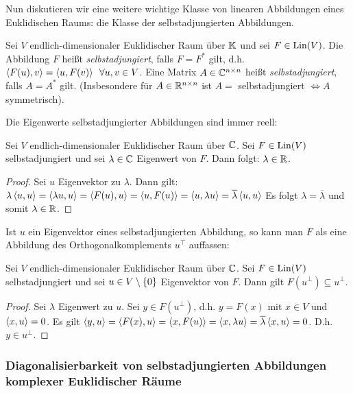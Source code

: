 Nun diskutieren wir eine weitere wichtige Klasse von linearen Abbildungen eines Euklidischen Raums: die Klasse der selbstadjungierten Abbildungen. 

Sei $ V $ endlich-dimensionaler Euklidischer Raum über $ \mathbb K $ und sei $ F \in \operatorname{Lin}(V) $. Die Abbildung $ F $ heißt \emph{selbstadjungiert}, falls $ F = F^\ast $ gilt, d.h. $ \left\langle F(u),v \right\rangle = \left\langle u,F(v) \right\rangle \enspace \forall u,v \in V $. Eine Matrix $ A \in \mathbb C^{n \times n} $ heißt \emph{selbstadjungiert}, falls $ A = A^\ast $ gilt. (Insbesondere für $ A \in \mathbb R^{n \times n} $ ist $ A = $ selbstadjungiert $ \Leftrightarrow A $ symmetrisch).

Die Eigenwerte selbstadjungierter Abbildungen sind immer reell:

\begin{propn}
	Sei $ V $ endlich-dimensionaler Euklidischer Raum über $ \mathbb C $. Sei $ F \in \operatorname{Lin}(V) $ selbstadjungiert und sei $ \lambda \in \mathbb C $ Eigenwert von $ F $. Dann folgt: $ \lambda \in \mathbb R $.
\end{propn}
\begin{proof}
	Sei $ u $ Eigenvektor zu $ \lambda $. Dann gilt: $ \lambda\left\langle u,u \right\rangle = \left\langle \lambda u,u \right\rangle = \left\langle F(u),u \right\rangle = \left\langle u,F(u) \right\rangle = \left\langle u,\lambda u \right\rangle = \overline{\lambda}\left\langle u,u \right\rangle $ Es folgt $ \lambda = \overline{\lambda} $ und somit $ \lambda \in \mathbb R $.
\end{proof}

Ist $u$ ein Eigenvektor eines selbstadjungierten Abbildung, so kann man $F$ als eine Abbildung des Orthogonalkomplements $u^\top$ auffassen: 
\begin{propn}
	Sei $ V $ endlich-dimensionaler Euklidischer Raum über $ \mathbb C $. Sei $ F \in \operatorname{Lin}(V) $ selbstadjungiert und sei $ u \in V \setminus \left\{ 0 \right\} $ Eigenvektor von $ F $. Dann gilt $ F(u^\bot) \subseteq u^\bot $.
\end{propn}
\begin{proof}
	Sei $ \lambda $ Eigenwert zu $ u $. Sei $ y \in F(u^\bot) $, d.h. $ y = F(x) $ mit $ x \in V $ und $ \left\langle x,u \right\rangle = 0 $. Es gilt $ \left\langle y,u \right\rangle = \left\langle F(x),u \right\rangle = \left\langle x,F(u) \right\rangle = \left\langle x,\lambda u \right\rangle = \overline{\lambda}\left\langle x,u \right\rangle = 0 $. D.h. $ y \in u^\bot $.
\end{proof}


\subsubsection{Diagonalisierbarkeit von selbstadjungierten Abbildungen komplexer Euklidischer Räume}

